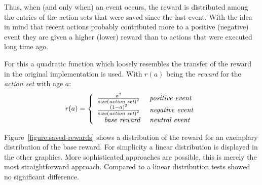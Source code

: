 Thus, when (and only when) an event occurs, the reward is distributed among the entries of the action sets that were saved since the last event. With the idea in mind that recent actions probably contributed more to a positive (negative) event they are given a higher (lower) reward than to actions that were executed long time ago. 

For this a quadratic function which loosely resembles the transfer of the reward in the original implementation is used. With \(r(a)\) being the \emph{reward} for the \emph{action set} with age \(a\):
$$
r(a) = \left\{ \begin{array}{rl}
  \frac{{a}^{2}}{{\mathrm{size(\emph{action set})}}^{2}} &\mbox{ \emph{positive event}} \\
  \frac{{(1 - a)}^{2}}{{\mathrm{size(\emph{action set})}}^{2}} &\mbox{ \emph{negative event}} \\
  \emph{base reward} &\mbox{ \emph{neutral event}}
       \end{array} \right.
$$

Figure~\ref{figure:saved-rewards} shows a distribution of the reward for an exemplary distribution of the base reward. For simplicity a linear distribution is displayed in the other graphics. More sophisticated approaches are possible, this is merely the most straightforward approach. Compared to a linear distribution tests showed no significant difference. 

